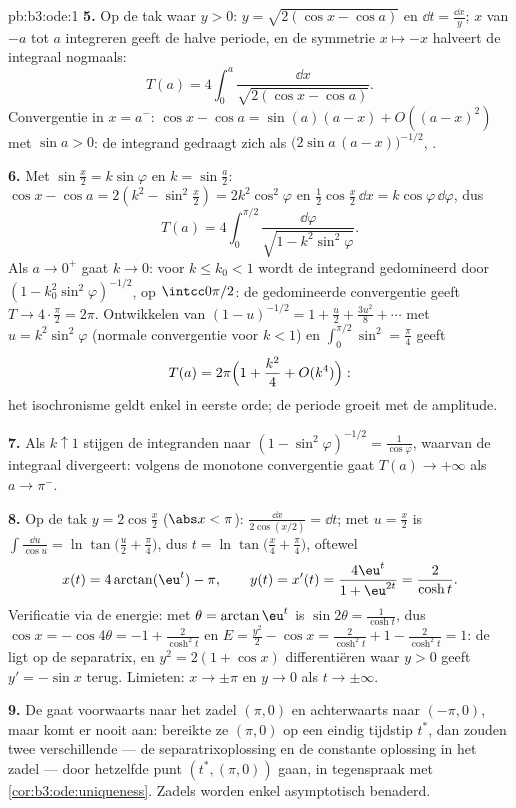 \begin{solution}{pb:b3:ode:1}
\textbf{5.} Op de tak waar $y > 0$: $y = \sqrt{2(\cos x - \cos
a)}$ en $\dd t = \frac{\dd x}{y}$; $x$ van $-a$ tot $a$
integreren geeft de halve periode, en de symmetrie $x \mapsto -x$
halveert de integraal nogmaals:
\[
T(a) = 4\int_0^a\frac{\dd x}{\sqrt{2(\cos x - \cos a)}} .
\]
Convergentie in $x = a^-$: $\cos x - \cos a = \sin(a)(a - x) +
O((a-x)^2)$ met $\sin a > 0$: de integrand gedraagt zich als
$\bigl(2\sin a\,(a - x)\bigr)^{-1/2}$, .

\textbf{6.} Met $\sin\frac x2 = k\sin\varphi$ en $k = \sin\frac
a2$: $\cos x - \cos a = 2(k^2 - \sin^2\frac x2) =
2k^2\cos^2\varphi$ en $\frac12\cos\frac x2\,\dd x =
k\cos\varphi\,\dd\varphi$, dus
\[
T(a) = 4\int_0^{\pi/2}
\frac{\dd\varphi}{\sqrt{1 - k^2\sin^2\varphi}} .
\]
Als $a \to 0^+$ gaat $k \to 0$: voor $k \leq k_0 < 1$ wordt de
integrand gedomineerd door $(1 - k_0^2\sin^2\varphi)^{-1/2}$,
 op $\intcc0{\pi/2}$: de gedomineerde convergentie geeft
$T \to 4\cdot\frac\pi2 = 2\pi$. Ontwikkelen van $(1 - u)^{-1/2} =
1 + \frac u2 + \frac{3u^2}8 + \cdots$ met $u = k^2\sin^2\varphi$
(normale convergentie voor $k < 1$) en $\int_0^{\pi/2}\sin^2 =
\frac\pi4$ geeft
\[
T(a) = 2\pi\Bigl(1 + \frac{k^2}{4} + O(k^4)\Bigr) :
\]
het isochronisme geldt enkel in eerste orde; de periode groeit
met de amplitude.

\textbf{7.} Als $k \uparrow 1$ stijgen de integranden naar $(1 -
\sin^2\varphi)^{-1/2} = \frac1{\cos\varphi}$, waarvan de
integraal divergeert: volgens de monotone convergentie gaat
$T(a) \to +\infty$ als $a \to \pi^-$.

\textbf{8.} Op de tak $y = 2\cos\frac x2$ ($\abs x < \pi$): $\frac
{\dd x}{2\cos(x/2)} = \dd t$; met $u = \frac x2$ is $\int\frac{\dd
u}{\cos u} = \ln\tan\bigl(\frac u2 + \frac\pi4\bigr)$, dus $t =
\ln\tan\bigl(\frac x4 + \frac\pi4\bigr)$, oftewel
\[
x(t) = 4\arctan(\eu^t) - \pi,
\qquad y(t) = x'(t) = \frac{4\eu^t}{1 + \eu^{2t}} =
\frac{2}{\cosh t} .
\]
Verificatie via de energie: met $\theta = \arctan\eu^t$ is
$\sin2\theta = \frac1{\cosh t}$, dus $\cos x = -\cos4\theta = -1
+ \frac{2}{\cosh^2t}$ en $E = \frac{y^2}2 - \cos x =
\frac2{\cosh^2t} + 1 - \frac2{\cosh^2t} = 1$: de  ligt op de
separatrix, en $y^2 = 2(1 + \cos x)$ differentiëren waar $y > 0$
geeft $y' = -\sin x$ terug. Limieten: $x \to \pm\pi$ en $y \to 0$
als $t \to \pm\infty$.

\textbf{9.} De  gaat voorwaarts naar het zadel $(\pi, 0)$ en
achterwaarts naar $(-\pi, 0)$, maar komt er nooit aan: bereikte
ze $(\pi, 0)$ op een eindig tijdstip $t^*$, dan zouden twee
verschillende  --- de separatrixoplossing en
de constante oplossing in het zadel --- door hetzelfde punt
$(t^*, (\pi, 0))$ gaan, in tegenspraak met
\cref{cor:b3:ode:uniqueness}. Zadels worden enkel asymptotisch
benaderd.


\end{solution}
